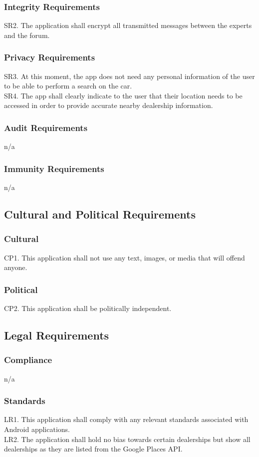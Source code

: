 \documentclass[12pt]{article}
\begin{document}
\subsubsection{Integrity Requirements}
SR2. The application shall encrypt all transmitted messages between the experts and the forum.
\subsubsection{Privacy Requirements}
SR3. At this moment, the app does not need any personal information of the user to be able to perform a search on the car.\\
SR4. The app shall clearly indicate to the user that their location needs to be accessed in order to provide accurate nearby dealership information.
\subsubsection{Audit Requirements}
n/a
\subsubsection{Immunity Requirements}
n/a
\subsection{Cultural and Political Requirements}
\subsubsection{Cultural}
CP1. This application shall not use any text, images, or media that will offend anyone.
\subsubsection{Political}
CP2. This application shall be politically independent.
\subsection{Legal Requirements}
\subsubsection{Compliance}
n/a
\subsubsection{Standards}
LR1. This application shall comply with any relevant standards associated with Android applications.\\
LR2. The application shall hold no bias towards certain dealerships but show all dealerships as they are listed from the Google Places API.
\end{document}
